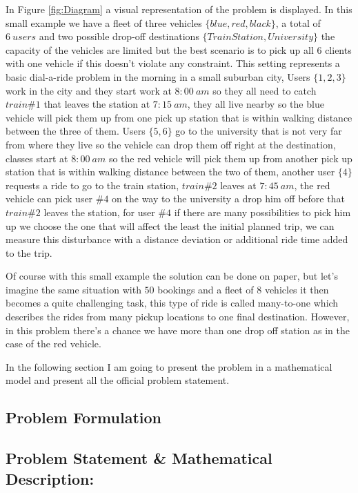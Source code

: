 \documentclass{article}
\begin{document}
In Figure \ref{fig:Diagram} a visual representation of the problem is displayed. In this small example we have a fleet of three vehicles $\{blue,red,black\}$, a total of $6\ users$ and two possible drop-off destinations $\{Train Station, University\}$ the capacity of the vehicles are limited but the best scenario is to pick up all $6$ clients with one vehicle if this doesn\rq{t} violate any constraint. This setting represents a basic dial-a-ride problem in the morning in a small suburban city, Users $\{1,2,3\}$ work in the city and they start work at $8:00 \ am$ so they all need to catch $train \#1$ that leaves the station at $7:15 \ am$, they all live nearby so the blue vehicle will pick them up from one pick up station that is within walking distance between the three of them. Users $\{5,6\}$ go to the university that is not very far from where they live so the vehicle can drop them off right at the destination, classes start at  $8:00 \  am$ so the red vehicle will pick them up from another pick up station  that is within walking distance between the two of them, another user  $\{4\}$ requests a ride to go to the train station, $train \#2$ leaves at $7:45 \ am$, the red vehicle can pick user $\#4 $ on the way to the university a drop him off before that
$train \#2$ leaves the station, for user $\#4 $ if there are many possibilities to pick him up we choose the one that will affect the least the initial planned trip, we can measure this disturbance with a distance deviation or additional ride time added to the trip.


Of course with this small example the solution can be done on paper, but let\rq{s} imagine the same situation with $50$ bookings and a fleet of $8$ vehicles it then becomes a quite challenging task, this type of ride is called many-to-one which describes the rides from many pickup locations to one final destination. However, in this problem there\rq{s} a chance we have more than one drop off station as in the case of the red vehicle.

In the following section I am going to present the problem in a mathematical model and present all the official problem statement.



\subsection{ Problem Formulation}
\label{subsection:problem_setting}

\subsection*{Problem Statement \& Mathematical Description:}
\end{document}
